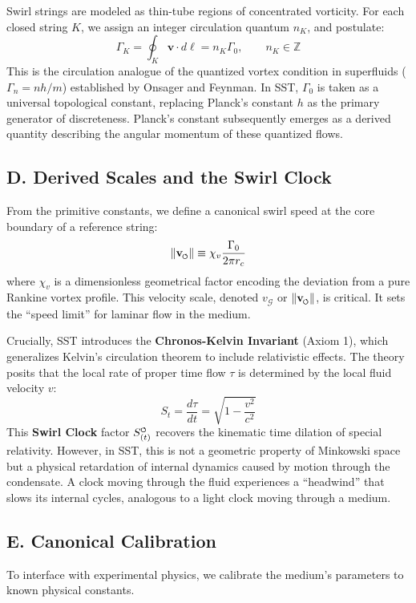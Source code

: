 \documentclass[11pt]{article}
\newcommand{\vswirl}{\mathbf{v}_{\mkern-2mu\scriptscriptstyle\boldsymbol{\circlearrowleft}}}
\newcommand{\SwirlClock}{S_{(t)}^{\mkern-1mu\scriptscriptstyle\boldsymbol{\circlearrowleft}}}
\begin{document}
Swirl strings are modeled as thin-tube regions of concentrated vorticity. For each closed string $K$, we assign an integer circulation quantum $n_K$, and postulate:
\begin{equation}
\Gamma_K = \oint_{K} \mathbf{v} \cdot d\boldsymbol{\ell} = n_K \Gamma_0, \qquad n_K \in \mathbb{Z}
\end{equation}
This is the circulation analogue of the quantized vortex condition in superfluids ($\Gamma_n = n h/m$) established by Onsager and Feynman. In SST, $\Gamma_0$ is taken as a universal topological constant, replacing Planck's constant $h$ as the primary generator of discreteness. Planck's constant subsequently emerges as a derived quantity describing the angular momentum of these quantized flows.

\subsection*{D. Derived Scales and the Swirl Clock}

From the primitive constants, we define a canonical swirl speed at the core boundary of a reference string:
\begin{equation}
\|\vswirl\| \equiv \chi_v \frac{\Gamma_0}{2\pi r_c}
\end{equation}
where $\chi_v$ is a dimensionless geometrical factor encoding the deviation from a pure Rankine vortex profile. This velocity scale, denoted $v_{\mathcal{G}}$ or $\|\vswirl\|$, is critical. It sets the ``speed limit'' for laminar flow in the medium.

Crucially, SST introduces the \textbf{Chronos-Kelvin Invariant} (Axiom 1), which generalizes Kelvin's circulation theorem to include relativistic effects. The theory posits that the local rate of proper time flow $\tau$ is determined by the local fluid velocity $v$:
\begin{equation}
S_t = \frac{d\tau}{dt} = \sqrt{1 - \frac{v^2}{c^2}}
\end{equation}
This \textbf{Swirl Clock} factor $\SwirlClock$ recovers the kinematic time dilation of special relativity. However, in SST, this is not a geometric property of Minkowski space but a physical retardation of internal dynamics caused by motion through the condensate. A clock moving through the fluid experiences a ``headwind'' that slows its internal cycles, analogous to a light clock moving through a medium.



\subsection*{E. Canonical Calibration}
To interface with experimental physics, we calibrate the medium's parameters to known physical constants.
\end{document}
